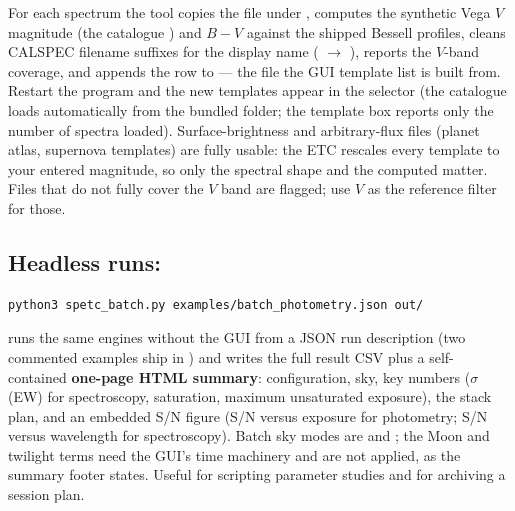 For each spectrum the tool copies the file under ,
computes the synthetic Vega $V$ magnitude (the catalogue ) and
$B-V$ against the shipped Bessell profiles, cleans CALSPEC filename
suffixes for the display name ( $\to$
), reports the $V$-band coverage, and appends the row to
 --- the file the GUI template list is built
from. Restart the program and the new templates appear in the selector
(the catalogue loads automatically from the bundled  folder;
the template box reports only the number of spectra loaded). Surface-brightness and arbitrary-flux files
(planet atlas, supernova templates) are fully usable: the ETC rescales
every template to your entered magnitude, so only the spectral shape and
the computed  matter. Files that do not fully cover the $V$
band are flagged; use $V$ as the reference filter for those.

\subsection{Headless runs: }
\label{sec:tool-batch}

\begin{verbatim}
python3 spetc_batch.py examples/batch_photometry.json out/
\end{verbatim}

runs the same engines without the GUI from a JSON run description (two
commented examples ship in ) and writes the full result
CSV plus a self-contained \textbf{one-page HTML summary}: configuration,
sky, key numbers ($\sigma$(EW) for spectroscopy, saturation, maximum
unsaturated exposure), the stack plan, and an embedded S/N figure (S/N
versus exposure for photometry; S/N versus wavelength for spectroscopy).
Batch sky modes are  and ; the Moon and twilight
terms need the GUI's time machinery and are not applied, as the summary
footer states. Useful for scripting parameter studies and for archiving a
session plan.
